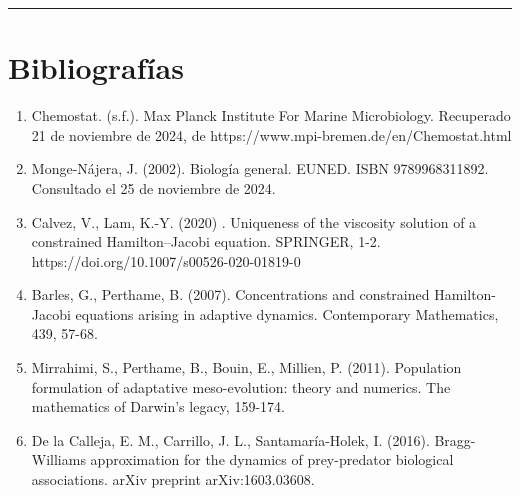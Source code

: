 \documentclass[letterpaper]{article}
\begin{document}
    \vspace{0.2cm}
        \rule{150mm}{0.5mm} %
    \vspace{0.2cm}

    \section{Bibliografías}

    \begin{enumerate}
        \item {

            \normalsize{Chemostat. (s.f.). Max Planck Institute For Marine Microbiology. Recuperado 21 de noviembre de 2024, de https://www.mpi-bremen.de/en/Chemostat.html}

        }

        \item {

            \normalsize{Monge-Nájera, J. (2002). Biología general. EUNED. ISBN 9789968311892. Consultado el 25 de noviembre de 2024.}
        
        }

        \item{
            \normalsize{Calvez, V., Lam, K.-Y. (2020) . Uniqueness of the viscosity solution of a constrained Hamilton–Jacobi equation. SPRINGER, 1-2. https://doi.org/10.1007/s00526-020-01819-0} 
        }

        \item {
            \normalsize{Barles, G., Perthame, B. (2007). Concentrations and constrained Hamilton-Jacobi equations arising in adaptive dynamics. Contemporary Mathematics, 439, 57-68.}
        }

        \item{
            \normalsize{Mirrahimi, S., Perthame, B., Bouin, E., Millien, P. (2011). Population formulation of adaptative meso-evolution: theory and numerics. The mathematics of Darwin’s legacy, 159-174.}
        }

        \item{
            \normalsize{De la Calleja, E. M., Carrillo, J. L., Santamaría-Holek, I. (2016). Bragg-Williams approximation for the dynamics of prey-predator biological associations. arXiv preprint arXiv:1603.03608.}
        }
    \end{enumerate}
\end{document}
